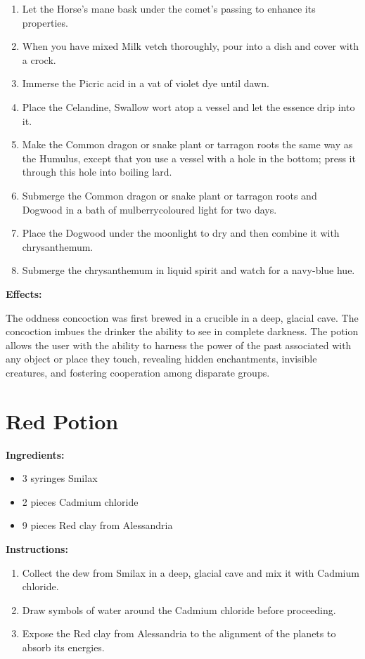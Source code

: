 \documentclass{article}
\begin{document}
\begin{enumerate}
  \item Let the Horse's mane bask under the comet’s passing to enhance its properties.
  \item When you have mixed Milk vetch thoroughly, pour into a dish and cover with a crock.
  \item Immerse the Picric acid in a vat of violet dye until dawn.
  \item Place the Celandine, Swallow wort atop a vessel and let the essence drip into it.
  \item Make the Common dragon or snake plant or tarragon roots the same way as the Humulus, except that you use a vessel with a hole in the bottom; press it through this hole into boiling lard.
  \item Submerge the Common dragon or snake plant or tarragon roots and Dogwood in a bath of mulberrycoloured light for two days.
  \item Place the Dogwood under the moonlight to dry and then combine it with chrysanthemum.
  \item Submerge the chrysanthemum in liquid spirit and watch for a navy-blue hue.
\end{enumerate}

\textbf{Effects:}

The oddness concoction was first brewed in a crucible in a deep, glacial cave. The concoction imbues the drinker the ability to see in complete darkness. The potion allows the user with the ability to harness the power of the past associated with any object or place they touch, revealing hidden enchantments, invisible creatures, and fostering cooperation among disparate groups.

\newpage
\section*{Red Potion}

\textbf{Ingredients:}

\begin{itemize}
  \item 3 syringes Smilax
  \item 2 pieces Cadmium chloride
  \item 9 pieces Red clay from Alessandria
\end{itemize}

\textbf{Instructions:}

\begin{enumerate}
  \item Collect the dew from Smilax in a deep, glacial cave and mix it with Cadmium chloride.
  \item Draw symbols of water around the Cadmium chloride before proceeding.
  \item Expose the Red clay from Alessandria to the alignment of the planets to absorb its energies.
\end{enumerate}
\end{document}
